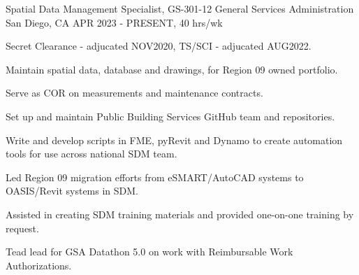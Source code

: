 


\begin{cventries}
\cventry
{Spatial Data Management Specialist, GS-301-12} %
{General Services Administration} %
{San Diego, CA} %
{APR 2023 - PRESENT, 40 hrs/wk} %
{ %
\begin{cvitems}
\item {Secret Clearance - adjucated NOV2020, TS/SCI - adjucated AUG2022.}
\item {Maintain spatial data, database and drawings, for Region 09 owned portfolio.}
\item {Serve as COR on measurements and maintenance contracts.}
\item {Set up and maintain Public Building Services GitHub team and repositories.}
\item {Write and develop scripts in FME, pyRevit and Dynamo to create automation tools for use across national SDM team.}
\item {Led Region 09 migration efforts from eSMART/AutoCAD systems to OASIS/Revit systems in SDM.}
\item {Assisted in creating SDM training materials and provided one-on-one training by request.}
\item {Tead lead for GSA Datathon 5.0 on work with Reimbursable Work Authorizations.}
\end{cvitems}
}



\end{cventries}
